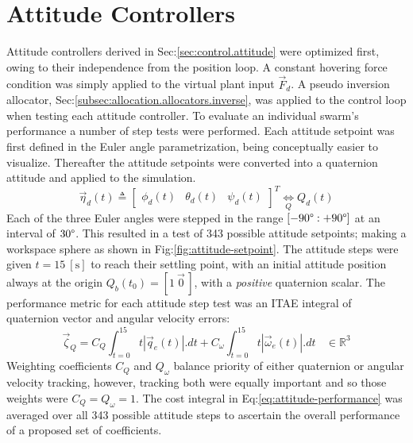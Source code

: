 \section{Attitude Controllers}
\label{sec:simulation.attitude}
Attitude controllers derived in Sec:\ref{sec:control.attitude} were optimized first, owing to their independence from the position loop. A constant hovering force condition was simply applied to the virtual plant input $\vec{F}_d$. A pseudo inversion allocator, Sec:\ref{subsec:allocation.allocators.inverse}, was applied to the control loop when testing each attitude controller. To evaluate an individual swarm's performance a number of step tests were performed. Each attitude setpoint was first defined in the Euler angle parametrization, being conceptually easier to visualize. Thereafter the attitude setpoints were converted into a quaternion attitude and applied to the simulation.
\begin{equation}
\vec{\eta}_d(t)\triangleq \begin{bmatrix}
\phi_d(t)&
\theta_d(t)&
\psi_d(t)
\end{bmatrix}^T\underset{Q}{\iff}Q_d(t)
\end{equation}
Each of the three Euler angles were stepped in the range $[-90\text{\textdegree}:+90\text{\textdegree}]$ at an interval of $30\text{\textdegree}$. This resulted in a test of 343 possible attitude setpoints; making a workspace sphere as shown in Fig:\ref{fig:attitude-setpoint}. The attitude steps were given $t=15~[\text{s}]$ to reach their settling point, with an initial attitude position always at the origin $Q_b(t_0)=[1~\vec{0}\hspace{2pt}]$, with a \emph{positive} quaternion scalar. The performance metric for each attitude step test was an ITAE integral of quaternion vector and angular velocity errors:
\begin{equation}\label{eq:attitude-performance}
\vec{\zeta}_{Q}=C_Q\int_{t=0}^{15}t|\vec{q}_e(t)|.dt+C_\omega\int_{t=0}^{15}t|\vec{\omega}_e(t)|.dt~~~~\in\mathbb{R}^{3}
\end{equation}
Weighting coefficients $C_Q$ and $Q_\omega$ balance priority of either quaternion or angular velocity tracking, however, tracking both were equally important and so those weights were $C_Q=Q_\omega=1$. The cost integral in Eq:\ref{eq:attitude-performance} was averaged over all 343 possible attitude steps to ascertain the overall performance of a proposed set of coefficients.
